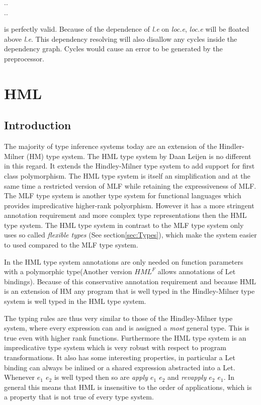\documentclass[twoside, titlepage, openright, a4paper]{book}
\newcommand{\Varid}[1]{\mathit{#1}}
\def\resethooks{%
  \global\let\SaveRestoreHook\empty
  \global\let\ColumnHook\empty}
\let\hspre\empty
\let\hspost\empty
\begin{document}
\begin{hscode}\SaveRestoreHook
\column{B}{@{}>{\hspre}l<{\hspost}@{}}%
\column{E}{@{}>{\hspre}l<{\hspost}@{}}%
\>[B]{}\Varid{l}\mbox{.}\Varid{e}\mathrel{=}\mbox{.}\Varid{e}{}\<[E]%
\\
\>[B]{}\mbox{.}\Varid{e}\mathrel{=}\Varid{m}\mbox{.}\Varid{l}{}\<[E]%
\ColumnHook
\end{hscode}\resethooks

is perfectly valid. Because of the dependence of \emph{l.e} on \emph{loc.e}, \emph{loc.e} will be floated above \emph{l.e}. This dependency resolving will also disallow any cycles inside the dependency graph. Cycles would cause an error to be generated by the preprocessor.


\chapter{HML}
\label{HML}
\section{Introduction}
The majority of type inference systems today are an extension of the  Hindler-Milner (HM)\cite{HM} type system. The HML\cite{HML} type system by Daan Leijen is no different in this regard. It extends the Hindley-Milner type system to add support for first class polymorphism. The HML type system is itself an simplification and at the same time a restricted version of MLF\cite{MLF} while retaining the expressiveness of MLF. The MLF type system is another type system for functional languages which provides impredicative higher-rank polyorphism. However it has a more stringent annotation requirement and more complex type representations then the HML type system. The HML type system in contrast to the MLF type system only uses so called \emph{flexible types} (See section\ref{sec:Types}), which make the system easier to used compared to the  MLF type system.

In the HML type system annotations are only needed on function parameters with a polymorphic type(Another version $HML^F$ allows annotations of Let bindings). Because of this conservative annotation requirement and because HML is an extension of HM any program that is well typed in the Hindley-Milner type system is well typed in the HML type system.

The typing rules are thus very similar to those of the Hindley-Milner type system, where every expression can and is assigned a \emph{most} general type. This is true even with higher rank functions. Furthermore the HML type system is an impredicative type system which is very robust with respect to program transformations. It also has some interesting properties, in particular a Let binding can always be inlined or a shared expression abstracted into a Let. Whenever \emph{$e_1$ $e_2$} is well typed then so are \emph{apply $e_1$ $e_2$} and \emph{revapply $e_2$ $e_1$}. In general this means that HML is insensitive to the order of applications, which is a property that is not true of every type system.
\end{document}
